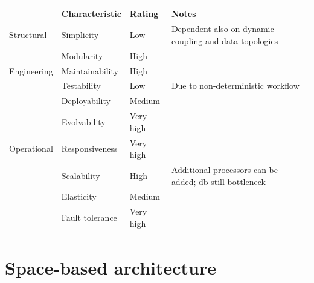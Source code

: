\begin{table}[h!]
  \renewcommand{\arraystretch}{1.4}
  \centering
  \begin{tabularx}{\textwidth}{l l l X}
    \toprule
    \textbf{}   & \textbf{Characteristic} & \textbf{Rating} & \textbf{Notes}                                          \\
    \midrule
    Structural  & Simplicity              & Low             & Dependent also on dynamic coupling and data topologies  \\
                & Modularity              & High            &                                                         \\
    \midrule
    Engineering & Maintainability         & High            &                                                         \\
                & Testability             & Low             & Due to non-deterministic workflow                       \\
                & Deployability           & Medium          &                                                         \\
                & Evolvability            & Very high       &                                                         \\
    \midrule
    Operational & Responsiveness          & Very high       &                                                         \\
                & Scalability             & High            & Additional processors can be added; db still bottleneck \\
                & Elasticity              & Medium          &                                                         \\
                & Fault tolerance         & Very high       &                                                         \\
    \bottomrule
  \end{tabularx}
\end{table}

\section{Space-based architecture}




